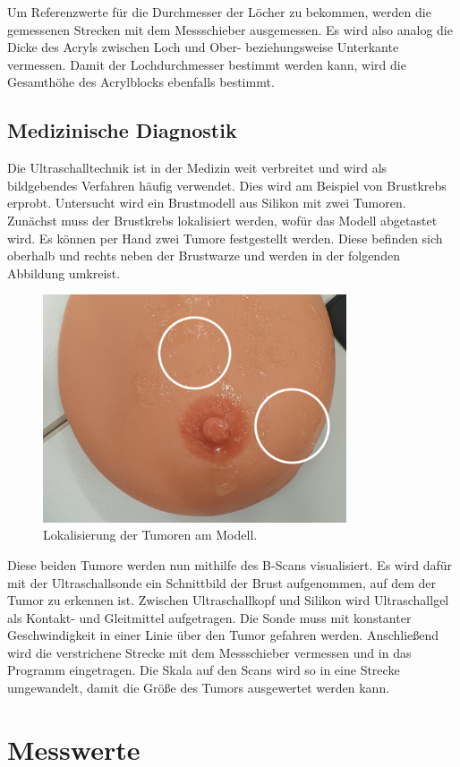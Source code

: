 \noindent Um Referenzwerte für die Durchmesser der Löcher zu bekommen, werden die gemessenen Strecken 
mit dem Messschieber ausgemessen. Es wird also analog die Dicke des Acryls zwischen Loch und Ober- 
beziehungsweise Unterkante vermessen. Damit der Lochdurchmesser bestimmt werden kann, wird die 
Gesamthöhe des Acrylblocks ebenfalls bestimmt. 


\subsection{Medizinische Diagnostik}
Die Ultraschalltechnik ist in der Medizin weit verbreitet und wird als bildgebendes Verfahren häufig 
verwendet. Dies wird am Beispiel von Brustkrebs erprobt. Untersucht wird ein Brustmodell aus Silikon 
mit zwei Tumoren. Zunächst muss der Brustkrebs lokalisiert werden, wofür das Modell abgetastet wird. 
Es können per Hand zwei Tumore festgestellt werden. Diese befinden sich oberhalb und rechts neben 
der Brustwarze und werden in der folgenden Abbildung umkreist. 

\begin{figure}[H]
    \centering
    \includegraphics[width = 0.8\textwidth]{Tumororientierung2.jpg}
    \caption{Lokalisierung der Tumoren am Modell.}
\end{figure}
 
\noindent Diese beiden Tumore werden nun mithilfe des B-Scans visualisiert. Es wird dafür mit der 
Ultraschallsonde ein Schnittbild der Brust aufgenommen, auf dem der Tumor zu erkennen ist. Zwischen 
Ultraschallkopf und Silikon wird Ultraschallgel als Kontakt- und Gleitmittel aufgetragen. Die Sonde 
muss mit konstanter Geschwindigkeit in einer Linie über den Tumor gefahren werden. Anschließend wird 
die verstrichene Strecke mit dem Messschieber vermessen und in das Programm eingetragen. Die Skala 
auf den Scans wird so in eine Strecke umgewandelt, damit die Größe des Tumors ausgewertet werden kann.



\section{Messwerte}



